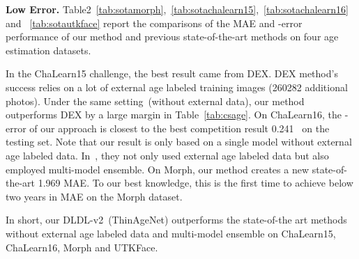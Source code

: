 \documentclass[5p,times,twocolumn]{elsarticle}
\begin{document}
\textbf{Low Error.}
Table2~\ref{tab:sotamorph},~\ref{tab:sotachalearn15},~\ref{tab:sotachalearn16} and~
\ref{tab:sotautkface} report the comparisons of the MAE and -error performance of our method and previous state-of-the-art methods on four age estimation datasets. 

In the ChaLearn15 challenge, the best result came from DEX. DEX method's success relies on a lot of external age labeled training images (260282 additional photos). Under the same setting~(without external data), our method outperforms DEX by a large margin in Table~\ref{tab:csage}.
On ChaLearn16, the -error  of our approach is closest to the best competition result 0.241~\cite{antipov2016apparent} on the testing set. Note that our result is only based on a single model without external age labeled data. In~\cite{antipov2016apparent}, they not only used external age labeled data but also employed multi-model ensemble. On Morph, our method creates a new state-of-the-art 1.969 MAE. To our best knowledge, this is the first time to achieve below two years in MAE on the Morph dataset. 

In short, our DLDL-v2~(ThinAgeNet) outperforms the state-of-the art methods without external age labeled data and multi-model ensemble on ChaLearn15, ChaLearn16, Morph and {UTKFace}.
\end{document}
